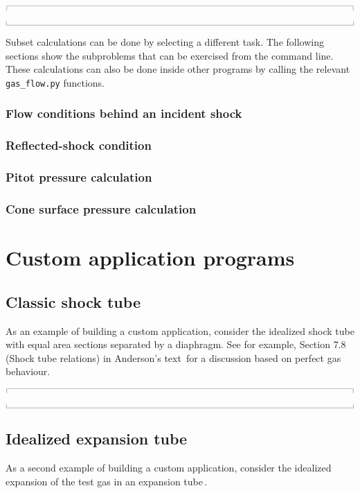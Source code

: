 \documentclass[10pt,a4paper]{article}
\newcommand{\topbar}{\ensuremath{
    \rule{0.1mm}{2.0mm} \rule[2.0mm]{159.5mm}{0.1mm} \rule{0.1mm}{2.0mm}
}}
\newcommand{\bottombar}{\ensuremath{
    \rule{0.1mm}{2.0mm} \rule{159.5mm}{0.1mm} \rule{0.1mm}{2.0mm}
}}
\begin{document}
\medskip
\noindent\topbar

\bottombar

\medskip
Subset calculations can be done by selecting a different task.
The following sections show the subproblems that can be exercised from the command line.
These calculations can also be done inside other programs by calling 
the relevant \verb?gas_flow.py? functions.

\bigskip
\subsubsection*{Flow conditions behind an incident shock}
%

\bigskip
\subsubsection*{Reflected-shock condition}
%

\bigskip
\subsubsection*{Pitot pressure calculation}
%


\bigskip
\subsubsection*{Cone surface pressure calculation}
%


\bigskip
\section{Custom application programs}
%
\subsection{Classic shock tube}
%
As an example of building a custom application, consider the idealized shock tube 
with equal area sections separated by a diaphragm.
See for example, Section 7.8 (Shock tube relations) in Anderson's text\,\cite{anderson_82}
for a discussion based on perfect gas behaviour.

\medskip
\noindent\topbar

\bottombar

\bigskip
\subsection{Idealized expansion tube}
%
As a second example of building a custom application, consider the idealized expansion
of the test gas in an expansion tube\,\cite{trimpi_62}.
\end{document}
